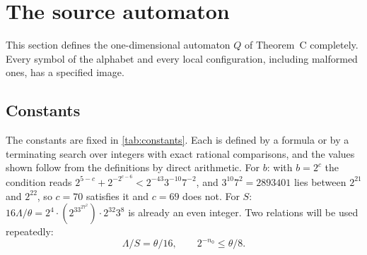 \documentclass[11pt]{article}
\theoremstyle{plain}
\theoremstyle{definition}
\theoremstyle{remark}
\begin{document}
\section{The source automaton}\label{sec:rule}

This section defines the one-dimensional automaton $Q$ of Theorem~C completely. Every symbol of the alphabet and every local configuration, including malformed ones, has a specified image.

\subsection{Constants}

The constants are fixed in \cref{tab:constants}. Each is defined by a formula or by a terminating search over integers with exact rational comparisons, and the values shown follow from the definitions by direct arithmetic. For $b$: with $b=2^c$ the condition reads $2^{5-c}+2^{-2^{c-6}}<2^{-43}3^{-10}7^{-2}$, and $3^{10}7^2=2893401$ lies between $2^{21}$ and $2^{22}$, so $c=70$ satisfies it and $c=69$ does not. For $S$: $16\Lambda/\theta=2^4\cdot(2^33^27^2)\cdot2^{32}3^8$ is already an even integer. Two relations will be used repeatedly:
\begin{equation}\label{eq:constant-relations}
\Lambda/S=\theta/16,\qquad 2^{-n_0}\le\theta/8 .
\end{equation}
\end{document}
